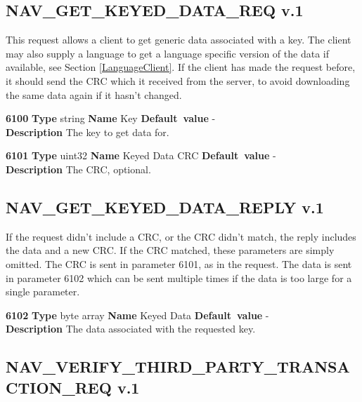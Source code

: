 \documentclass[a4paper]{article}
\begin{document}
\subsection{NAV\_GET\_KEYED\_DATA\_REQ v.1}

This request allows a client to get generic data associated with a key. The
client may also supply a language to get a language specific version of the 
data if available, see Section \ref{LanguageClient}. If the client has made 
the request before, it should send the CRC which it received from the server, 
to avoid downloading the same data again if it hasn't changed.

\begin{list}{\textbf{ParamID}}{}
\item \textbf{6100} \textbf{Type} string \textbf{Name} Key
                 \textbf{Default~value} - \\
  \textbf{Description} The key to get data for.
\item \textbf{6101} \textbf{Type} uint32 \textbf{Name} Keyed Data CRC
                 \textbf{Default~value} - \\
  \textbf{Description} The CRC, optional.
\end{list}

\subsection{NAV\_GET\_KEYED\_DATA\_REPLY v.1}

If the request didn't include a CRC, or the CRC didn't match, the reply
includes the data and a new CRC. If the CRC matched, these parameters are
simply omitted. The CRC is sent in parameter 6101, as in the request.
The data is sent in parameter 6102 which can be sent multiple times if the
data is too large for a single parameter.

\begin{list}{\textbf{ParamID}}{}
\item \textbf{6102} \textbf{Type} byte array \textbf{Name} Keyed Data
                 \textbf{Default~value} - \\
  \textbf{Description} The data associated with the requested key.
\end{list}

\subsection{NAV\_VERIFY\_THIRD\_PARTY\_TRANSACTION\_REQ v.1}
\end{document}
